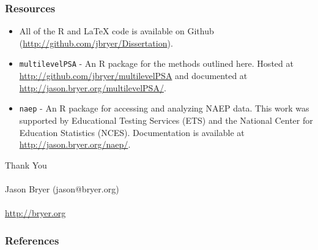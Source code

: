 \documentclass[10pt,handout,mathserif]{beamer}
\begin{document}
\begin{frame}[c]
	\frametitle{Resources}
	\begin{itemize}
    \setlength{\itemsep}{15pt}
		\item All of the R and \LaTeX{} code is available on Github (\url{http://github.com/jbryer/Dissertation}).
		\item \texttt{multilevelPSA} - An R package for the methods outlined here. Hosted at \url{http://github.com/jbryer/multilevelPSA} and documented at \url{http://jason.bryer.org/multilevelPSA/}.
		\item \texttt{naep} - An R package for accessing and analyzing NAEP data. This work was supported by Educational Testing Services (ETS) and the National Center for Education Statistics (NCES). Documentation is available at \url{http://jason.bryer.org/naep/}.
	\end{itemize}
\end{frame}


\begin{frame}[c]
	\LARGE{Thank You}\\
	\normalsize
	\ \\
	Jason Bryer (jason@bryer.org)\\
	\ \\
	\url{http://bryer.org}\\
\end{frame}


\begin{frame}[c,shrink=30]
    \nocite{HelmreichPruzek2009}
	\frametitle{References}
	
	
\end{frame}
\end{document}
